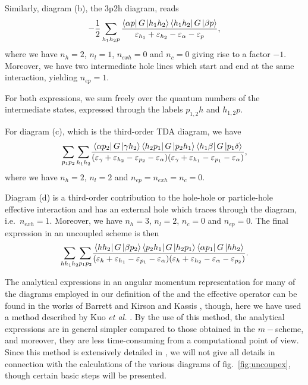 Similarly, diagram (b), the 3p2h diagram, reads
\begin{equation}
{\displaystyle
-\frac{1}{2}\sum_{h_1h_2p}\frac{\left\langle \alpha p \right|G
\left| h_1h_2 \right\rangle\left\langle h_1h_2 \right|G\left| \beta p \right\rangle}
{\varepsilon_{h_1} +\varepsilon_{h_2}-\varepsilon_{\alpha}-\varepsilon_{p}}},
\label{eq:un3p2h}
\end{equation}
where we have $n_h=2$, $n_l=1$, $n_{exh}=0$ and $n_c=0$ giving rise to a factor
$-1$. Moreover, we have two intermediate hole lines which start and end at the
same interaction, yielding $n_{ep}=1$.

For both expressions, we sum freely over the quantum numbers of the intermediate
states, expressed through the labels $p_{1,2}h$ and $h_{1,2}p$.

For diagram (c), which is the third-order TDA diagram, we have
\begin{equation}
{\displaystyle\sum_{p_{1}p_{2}}\sum_{h_{1}h_{2}}}
\frac{\left\langle \alpha p_2 \right|G\left| \gamma h_2 \right\rangle\left\langle h_2p_1 \right|G\left| p_2h_1 \right\rangle
\left\langle h_1\beta \right|G\left| p_1\delta \right\rangle}
{(\varepsilon_{\gamma}+\varepsilon_{h_{2}}-\varepsilon_{p_{2}}-\varepsilon_{\alpha})
(\varepsilon_{\gamma}+\varepsilon_{h_{1}}-
  \varepsilon_{p_{1}}-\varepsilon_{\alpha})},
\end{equation}
where we have $n_h=2$, $n_l=2$ and $n_{ep}=n_{exh}=n_c=0$.

Diagram (d) is a third-order contribution to the hole-hole or
particle-hole effective interaction and has an external hole which 
traces through the diagram, i.e.\ $n_{exh}=1$. Moreover, we have
$n_h=3$, $n_l=2$, $n_c=0$ and $n_{ep}=0$. The final expression in an
uncoupled scheme is then
\begin{equation}
{\displaystyle\sum_{hh_{1}h_{2}}}
{\displaystyle\sum_{p_{1}p_{2}}}
\frac{\left\langle hh_2 \right|G\left| \beta p_2 \right\rangle\left\langle p_2h_1 \right|G\left| h_2p_1 \right\rangle
\left\langle \alpha p_1 \right|G\left| hh_2 \right\rangle}
{(\varepsilon_{h}+\varepsilon_{h_{1}}-
\varepsilon_{p_{1}}-\varepsilon_{\alpha})(\varepsilon_{h}+
\varepsilon_{h_{2}}-\varepsilon_{\alpha}-
\varepsilon_{p_{2}})}.
\end{equation}



The analytical expressions in an angular momentum representation
for many of the diagrams employed in our definition
of the \qbox and the effective operator can be
found in the works of Barrett and Kirson \cite{bk70} and
Kassis \cite{kassis}, 
though, here we have used a method
described by Kuo {\em et al.} \cite{kstop81}. By the use of this method,
the analytical expressions are in general simpler compared to
those obtained in the $m-$scheme, and moreover, they are less
time-consuming from a computational point of view. 
Since this method is extensively detailed in \cite{kstop81},
we will not give all details
in connection with the calculations of the various diagrams of fig.\
\ref{fig:uncoupex}, though certain basic steps will be presented.

